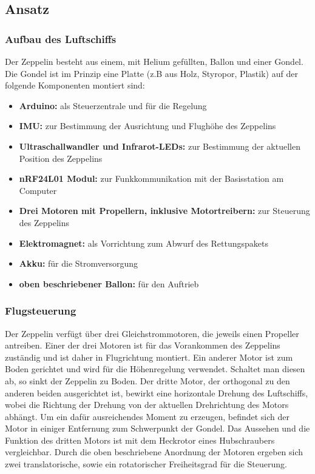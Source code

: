 \documentclass[lang=ngerman,inputenc=utf8,fontsize=10pt]{ldvarticle}
\begin{document}
\subsection*{Ansatz}
\subsubsection*{Aufbau des Luftschiffs}
Der Zeppelin besteht aus einem, mit Helium gefüllten, Ballon und einer Gondel. Die Gondel ist im Prinzip eine Platte (z.B aus Holz, Styropor, Plastik) auf der folgende Komponenten montiert sind:
\begin{itemize}
\item \textbf{Arduino:} als Steuerzentrale und für die Regelung
\item \textbf{IMU:} zur Bestimmung der Ausrichtung und Flughöhe des Zeppelins 
\item \textbf{Ultraschallwandler und Infrarot-LEDs:} zur Bestimmung der aktuellen Position des Zeppelins
\item \textbf{nRF24L01 Modul:} zur Funkkommunikation mit der Basisstation am Computer
\item \textbf{Drei Motoren mit Propellern, inklusive Motortreibern:} zur Steuerung des Zeppelins
\item \textbf{Elektromagnet:} als Vorrichtung zum Abwurf des Rettungspakets
\item \textbf{Akku:} für die Stromversorgung
\item \textbf{oben beschriebener Ballon:} für den Auftrieb
\end{itemize}

\subsubsection*{Flugsteuerung} 
Der Zeppelin verfügt über drei Gleichstrommotoren, die jeweils einen Propeller antreiben. Einer der drei Motoren ist für das Vorankommen des Zeppelins zuständig und ist daher in Flugrichtung montiert. Ein anderer Motor ist zum Boden gerichtet und wird für die Höhenregelung verwendet. Schaltet man diesen ab, so sinkt der Zeppelin zu Boden. Der dritte Motor, der orthogonal zu den anderen beiden ausgerichtet ist, bewirkt eine horizontale Drehung des Luftschiffs, wobei die Richtung der Drehung von der aktuellen Drehrichtung des Motors abhängt. Um ein dafür ausreichendes Moment zu erzeugen, befindet sich der Motor in einiger Entfernung zum Schwerpunkt der Gondel. Das Aussehen und die Funktion des dritten Motors ist mit dem Heckrotor eines Hubschraubers vergleichbar. Durch die oben beschriebene Anordnung der Motoren ergeben sich zwei translatorische, sowie ein rotatorischer Freiheitsgrad für die Steuerung.
\end{document}
